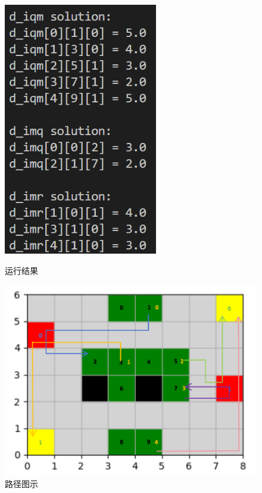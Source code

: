 \documentclass[withoutpreface,bwprint]{thesis-config}
\begin{document}
\begin{figure}[!htbp]
    \centering
        \begin{minipage}[b]{0.4\linewidth}
            \centering
            \includegraphics[width=0.6\textwidth]{figures/result2.2.png}
            \caption{运行结果}
        \end{minipage}%
        \begin{minipage}[b]{0.58\linewidth}
            \centering
            \includegraphics[width=1\textwidth]{figures/2.2.png}
            \caption{路径图示}
        \end{minipage}
\end{figure}
\end{document}

